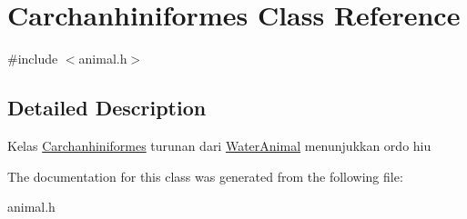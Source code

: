 \hypertarget{classCarchanhiniformes}{}\section{Carchanhiniformes Class Reference}
\label{classCarchanhiniformes}


{\ttfamily \#include $<$animal.\+h$>$}



\subsection{Detailed Description}
Kelas \hyperlink{classCarchanhiniformes}{Carchanhiniformes} turunan dari \hyperlink{classWaterAnimal}{Water\+Animal} menunjukkan ordo hiu 

The documentation for this class was generated from the following file\+:\begin{DoxyCompactItemize}
\item 
animal.\+h\end{DoxyCompactItemize}
